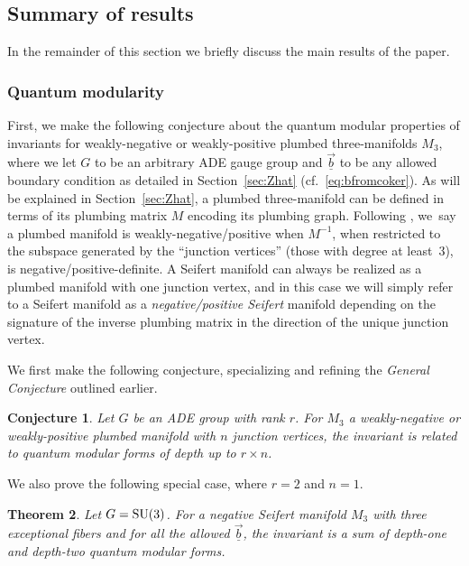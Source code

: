 \documentclass[10pt,a4paper]{amsart}
\def\Zh{\widehat{Z}}
\newcommand{\Zhlong}[3]{\ensuremath{\widehat{Z}^{#1}_{#2}\left(#3;\tau\right)}}
\def\bv{{\vec{\underline{b}}}}
\newtheorem{thm}{Theorem}[section]
\newtheorem{conj}[thm]{Conjecture}
\theoremstyle{definition}
\numberwithin{equation}{section}
\begin{document}
\subsection{Summary of results}\label{subsec:sum}
In the remainder of this section we briefly discuss the main results of the paper.

\subsubsection*{Quantum modularity}
First, we make the following conjecture about the quantum modular properties of \smash{$\Zh^G_{\vec{\underline{b}}}(M_3)$} invariants for weakly-negative or weakly-positive plumbed three-manifolds $M_3$, where we let $G$ to be an arbitrary ADE gauge group and $\vec{\underline{b}}$ to be any allowed boundary condition as detailed in Section~\ref{sec:Zhat} (cf.\ \eqref{eq:bfromcoker}). As will be explained in Section~\ref{sec:Zhat}, a plumbed three-manifold can be defined in terms of its plumbing matrix $M$ encoding its plumbing graph. Following \cite{cheng20193d}, we~say a plumbed manifold is weakly-negative/positive when $M^{-1}$, when restricted to the subspace generated by the ``junction vertices'' (those with degree at least~3), is negative/positive-definite. A Seifert manifold can always be realized as a plumbed manifold with one junction vertex, and in this case we will simply refer to a Seifert manifold as a {\it negative/positive Seifert} manifold depending on the signature of the inverse plumbing matrix in the direction of the unique junction vertex.

We first make the following conjecture, specializing and refining the {\it General Conjecture} outlined earlier.
\begin{conj}\label{conj_qmf}
Let $G$ be an ADE group with rank $r$. For $M_3$ a weakly-negative or weakly-positive plumbed manifold with $n$ junction vertices, the invariant \smash{$\Zhlong{G}{\bv}{M_3}$} is related to quantum modular forms of depth up to $r\times n$.
\end{conj}

We also prove the following special case, where $r=2$ and $n=1$.

\begin{thm}\label{thm1_intro}
 Let $G={\rm SU}(3)$. For a negative Seifert manifold $M_3$ with three exceptional fibers and for all the allowed ${\vec{\underline{b}}}$, the invariant \smash{$\Zhlong{G}{\bv}{M_3}$} is a sum of depth-one and depth-two quantum modular forms.
\end{thm}
\end{document}
